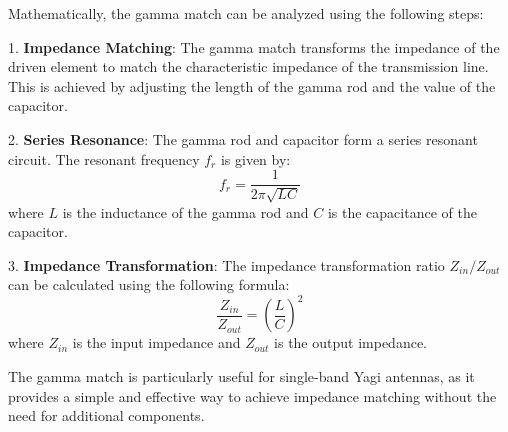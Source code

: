 Mathematically, the gamma match can be analyzed using the following steps:

1. \textbf{Impedance Matching}: The gamma match transforms the impedance of the driven element to match the characteristic impedance of the transmission line. This is achieved by adjusting the length of the gamma rod and the value of the capacitor.

2. \textbf{Series Resonance}: The gamma rod and capacitor form a series resonant circuit. The resonant frequency \( f_r \) is given by:
   \[
   f_r = \frac{1}{2\pi \sqrt{L C}}
   \]
   where \( L \) is the inductance of the gamma rod and \( C \) is the capacitance of the capacitor.

3. \textbf{Impedance Transformation}: The impedance transformation ratio \( Z_{in}/Z_{out} \) can be calculated using the following formula:
   \[
   \frac{Z_{in}}{Z_{out}} = \left( \frac{L}{C} \right)^2
   \]
   where \( Z_{in} \) is the input impedance and \( Z_{out} \) is the output impedance.

The gamma match is particularly useful for single-band Yagi antennas, as it provides a simple and effective way to achieve impedance matching without the need for additional components.

